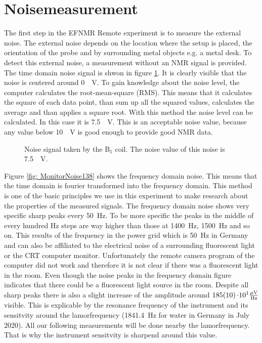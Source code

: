 \section{Noisemeasurement}
\label{sec:Noisemeasurement}
The first step in the EFNMR Remote experiment is to measure the external noise. The external noise depends on the location where the setup is placed, the orientation of the probe and by surrounding metal objects e.g. a metal desk. To detect this external noise, a measurement without an NMR signal is provided. The time domain noise signal is shwon in figure \ref{fig: noise}. It is clearly visible that the noise is centered around \SI{0}{\mu \volt}. To gain knowledge about the noise level, the computer calculates the root-mean-square (RMS). This means that it calculates the square of each data point, than sum up all the squared values, calculates the average and than applies a square root. With this method the noise level can be calculated. In this case it is \SI{7.5}{\mu \volt}. This is an acceptable noise value, because any value below \SI{10}{\mu \volt} is good enough to provide good NMR data.

\begin{figure}[H]
    \centering
    
    \caption[Noise signal taken by the B$_1$ coil.]{Noise signal taken by the B$_1$ coil. The noise value of this noise is \SI{7.5}{\mu \volt}.}
    \label{fig: noise}
\end{figure}

Figure \ref{fig: MonitorNoise138} shows the frequency domain noise. This means that the time domain is fourier transformed into the frequency domain. This method is one of the basic principles we use in this experiment to make research about the properties of the measured signals. The frequency domain noise shows very specific sharp peaks every \SI{50}{\hertz}. To be more specific the peaks in the middle of every hundred \si{\hertz} steps are way higher than those at \SI{1400}{\hertz}, \SI{1500}{\hertz} and so on. This results of the frequency in the power grid which is \SI{50}{\hertz} in Germany and can also be affiliated to the electrical noise of a surrounding fluorescent light or the CRT computer monitor. Unfortunately the remote camera program of the computer did not work and therefore it is not clear if there was a fluorescent light in the room. Even though the noise peaks in the frequency domain figure indicates that there could be a fluorescent light source in the room.
Despite all sharp peaks there is also a slight increase of the amplitude around $\SI{185 \pm 10}{\cdot 10^1 \frac{\mu \volt}{\hertz}}$ visible. This is explicable by the resonance frequency of the instrument and its sensitvity around the lamorfrequency (\SI{1841.4}{\hertz} for water in Germany in July 2020). All our following measurements will be done nearby the lamorfrequency. That is why the instrument sensitvity is sharpend around this value.

